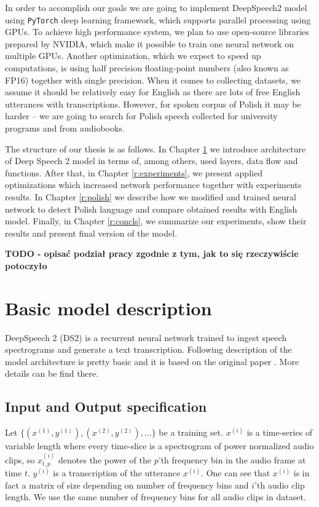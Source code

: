 \documentclass[licencjacka,en]{pracamgr}
\begin{document}
In order to accomplish our goals we are going to implement DeepSpeech2 model using \texttt{PyTorch} deep learning framework, which supports parallel processing using GPUs. To achieve high performance system, we plan to use open-source libraries prepared by NVIDIA, which make it possible to train one neural network on multiple GPUs. Another optimization, which we expect to speed up computations, is using half precision floating-point numbers (also known as FP16) together with single precision. When it comes to collecting datasets, we assume it should be relatively easy for English as there are lots of free English utterances with transcriptions. However, for spoken corpus of Polish it may be harder -- we are going to search for Polish speech collected for university programs and from audiobooks.

The structure of our thesis is as follows. In Chapter \ref{r:desc} we introduce architecture of Deep Speech 2 model in terms of, among others, used layers, data flow and functions. After that, in Chapter \ref{r:experiments}, we present applied optimizations which increased network performance together with experiments results. In Chapter \ref{r:polish} we describe how we modified and trained neural network to detect Polish language and compare obtained results with English model. Finally, in Chapter \ref{r:concls}, we summarize our experiments, show their results and present final version of the model.

\textbf{TODO - opisać podział pracy zgodnie z tym, jak to się rzeczywiście potoczyło}

\chapter{Basic model description}\label{r:desc}

DeepSpeech 2 (DS2) is a recurrent neural network trained to ingest speech spectrograms and generate a text transcription.
Following description of the model architecture is pretty basic and it is based on the original paper \cite{DS2}. More details can be find there.

\section{Input and Output specification} \label{sec:input}
Let $\{(x^{(1)}, y^{(1)}), (x^{(2)}, y^{(2)}), ...\}$ be a training set. $x^{(i)}$ is a time-series of variable length where every time-slice is a spectrogram of power
normalized audio clips, so $x^{(i)}_{t,p}$ denotes the power of the $p$’th frequency bin in the audio frame at time $t$. $y^{(i)}$ is a transcription of the utterance $x^{(i)}$. One can see that $x^{(i)}$ is in fact a matrix of size depending on number of frequency bins and $i$'th audio clip length. We use the same number of frequency bins for all audio clips in dataset.
\end{document}
